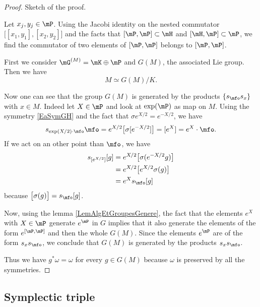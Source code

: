 \begin{proof}
	Sketch of the proof.

	Let $x_j,y_j\in\mP$. Using the Jacobi identity on the nested commutator $\big[ [x_1,y_1],[x_2,y_2] \big]$ and the facts that $[\mP,\mP]\subset\mH$ and $[\mH,\mP]\subset \mP$, we find the commutator of two elements of $[\mP,\mP]$ belongs to $[\mP,\mP]$.

	First we consider $\mG^{(M)}=\mK\oplus\mP$ and $G(M)$, the associated Lie group. Then we have
	\begin{equation}
		M\simeq G(M)/K.
	\end{equation}
	
	Now one can see that the group $G(M)$ is generated by the products $\{ s_{\mfo}s_x\}$ with $x\in M$. Indeed let $X\in\mP$ and look at $\exp(\mP)$ as map on $M$. Using the symmetry \eqref{EaSymGH} and the fact that $\sigma e^{X/2}= e^{-X/2}$, we have
	\begin{equation}
		s_{\exp(X/2)\cdot \mfo}\mfo= e^{X/2}\big[ \sigma[ e^{-X/2}] \big]=[ e^{X}]= e^{X}\cdot \mfo.
	\end{equation}
	If we act on an other point than $\mfo$, we have
	\begin{equation}
		\begin{aligned}[]
			s_{[ e^{X/2}]}[g]&= e^{X/2}\big[ \sigma( e^{-X/2}g) \big]\\
			&= e^{X/2}\big[  e^{X/2}\sigma(g) \big]\\
			&= e^{X}s_{\mfo}[g]
		\end{aligned}
	\end{equation}
	because $\big[ \sigma(g) \big]=s_{\mfo}[g]$.

	Now, using the lemma \ref{LemAlgEtGroupesGenere}, the fact that the elements $ e^{X}$ with $X\in\mP$ generate $ e^{\mP}$ in $G$ implies that it also generate the elements of the form $ e^{[\mP,\mP]}$ and then the whole $G(M)$. Since the elements $ e^{\mP}$ are of the form $s_{x}s_{\mfo}$, we conclude that $G(M)$ is generated by the products $s_{x}s_{\mfo}$.
	
	Thus we have $g^*\omega=\omega$ for every $g\in G(M)$ because $\omega$ is preserved by all the symmetries.
\end{proof}

\subsection{Symplectic triple}
\label{SubSecTripleSylple}

